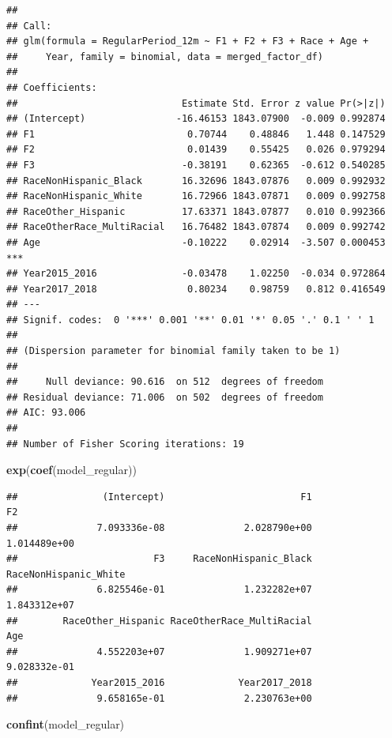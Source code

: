 \documentclass[
]{article}
\newenvironment{Shaded}{\begin{snugshade}}{\end{snugshade}}
\newcommand{\FunctionTok}[1]{\textcolor[rgb]{0.13,0.29,0.53}{\textbf{#1}}}
\newcommand{\NormalTok}[1]{#1}
\begin{document}
\begin{verbatim}
## 
## Call:
## glm(formula = RegularPeriod_12m ~ F1 + F2 + F3 + Race + Age + 
##     Year, family = binomial, data = merged_factor_df)
## 
## Coefficients:
##                             Estimate Std. Error z value Pr(>|z|)    
## (Intercept)                -16.46153 1843.07900  -0.009 0.992874    
## F1                           0.70744    0.48846   1.448 0.147529    
## F2                           0.01439    0.55425   0.026 0.979294    
## F3                          -0.38191    0.62365  -0.612 0.540285    
## RaceNonHispanic_Black       16.32696 1843.07876   0.009 0.992932    
## RaceNonHispanic_White       16.72966 1843.07871   0.009 0.992758    
## RaceOther_Hispanic          17.63371 1843.07877   0.010 0.992366    
## RaceOtherRace_MultiRacial   16.76482 1843.07874   0.009 0.992742    
## Age                         -0.10222    0.02914  -3.507 0.000453 ***
## Year2015_2016               -0.03478    1.02250  -0.034 0.972864    
## Year2017_2018                0.80234    0.98759   0.812 0.416549    
## ---
## Signif. codes:  0 '***' 0.001 '**' 0.01 '*' 0.05 '.' 0.1 ' ' 1
## 
## (Dispersion parameter for binomial family taken to be 1)
## 
##     Null deviance: 90.616  on 512  degrees of freedom
## Residual deviance: 71.006  on 502  degrees of freedom
## AIC: 93.006
## 
## Number of Fisher Scoring iterations: 19
\end{verbatim}

\begin{Shaded}
\begin{Highlighting}[]
\FunctionTok{exp}\NormalTok{(}\FunctionTok{coef}\NormalTok{(model\_regular))}
\end{Highlighting}
\end{Shaded}

\begin{verbatim}
##               (Intercept)                        F1                        F2 
##              7.093336e-08              2.028790e+00              1.014489e+00 
##                        F3     RaceNonHispanic_Black     RaceNonHispanic_White 
##              6.825546e-01              1.232282e+07              1.843312e+07 
##        RaceOther_Hispanic RaceOtherRace_MultiRacial                       Age 
##              4.552203e+07              1.909271e+07              9.028332e-01 
##             Year2015_2016             Year2017_2018 
##              9.658165e-01              2.230763e+00
\end{verbatim}

\begin{Shaded}
\begin{Highlighting}[]
\FunctionTok{confint}\NormalTok{(model\_regular)}
\end{Highlighting}
\end{Shaded}
\end{document}
